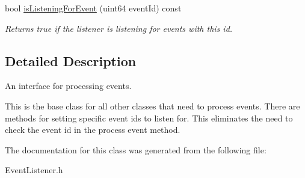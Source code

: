 \begin{DoxyCompactItemize}
\mbox{\label{class_arcana_1_1_event_listener_a63e5e68d753941f21711f7b91d123239}} 
bool \mbox{\hyperlink{class_arcana_1_1_event_listener_a63e5e68d753941f21711f7b91d123239}{is\+Listening\+For\+Event}} (uint64 event\+Id) const
\begin{DoxyCompactList}\small\item\em Returns true if the listener is listening for events with this id. \end{DoxyCompactList}\end{DoxyCompactItemize}


\subsection{Detailed Description}
An interface for processing events. 

This is the base class for all other classes that need to process events. There are methods for setting specific event ids to listen for. This eliminates the need to check the event id in the process event method. 

The documentation for this class was generated from the following file\+:\begin{DoxyCompactItemize}
\item 
Event\+Listener.\+h\end{DoxyCompactItemize}
